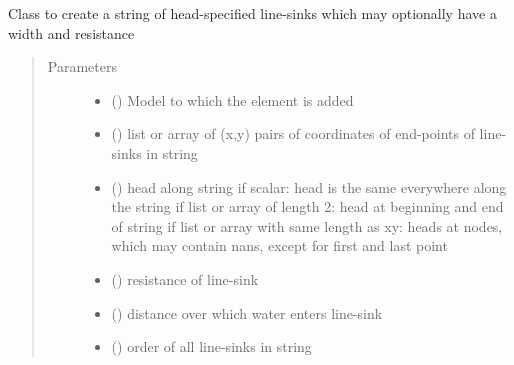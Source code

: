 \documentclass[letterpaper,10pt,english]{sphinxmanual}
\begin{document}
\begin{fulllineitems}
\label{\detokenize{linesinks/headlinesinkstring:timml.linesink.HeadLineSinkString}}
Class to create a string of head-specified line-sinks
which may optionally have a width and resistance
\begin{quote}\begin{description}
\item[{Parameters}] \leavevmode\begin{itemize}
\item {} 
 () \textendash{} Model to which the element is added

\item {} 
 () \textendash{} list or array of (x,y) pairs of coordinates of end-points of
line-sinks in string

\item {} 
 (\sphinxstyleliteralemphasis{, }) \textendash{} head along string
if scalar: head is the same everywhere along the string
if list or array of length 2: head at beginning and end of string
if list or array with same length as xy: heads at nodes, which
may contain nans, except for first and last point

\item {} 
 (\sphinxstyleliteralemphasis{ (}\sphinxstyleliteralemphasis{)}) \textendash{} resistance of line-sink

\item {} 
 () \textendash{} distance over which water enters line-sink

\item {} 
 (\sphinxstyleliteralemphasis{ (}\sphinxstyleliteralemphasis{)}) \textendash{} order of all line-sinks in string


\end{itemize}
\end{description}
\end{quote}
\end{fulllineitems}
\end{document}

